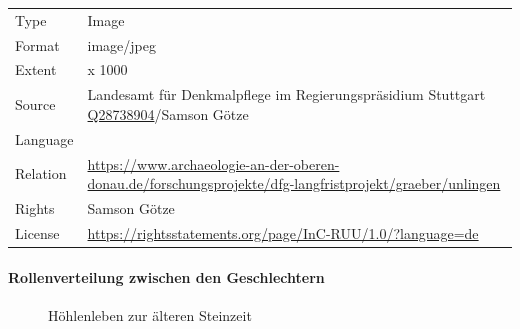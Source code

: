 \documentclass[
  letterpaper,
  DIV=11,
  numbers=noendperiod]{scrartcl}
\let\oldparagraph\paragraph
\renewcommand{\paragraph}[1]{\oldparagraph{#1}\mbox{}}
\begin{document}
\begin{longtable}[]{@{}
  >{\raggedright\arraybackslash}p{}
  >{\raggedright\arraybackslash}p{}@{}}
Type & Image \\
Format & image/jpeg \\
Extent & 703 x 1000 \\
Source & Landesamt für Denkmalpflege im Regierungspräsidium Stuttgart
\href{https://www.wikidata.org/wiki/Q28738904}{Q28738904}/Samson
Götze \\
Language & \\
Relation &
\url{https://www.archaeologie-an-der-oberen-donau.de/forschungsprojekte/dfg-langfristprojekt/graeber/unlingen} \\
Rights & Samson Götze \\
License &
\url{https://rightsstatements.org/page/InC-RUU/1.0/?language=de} \\
\end{longtable}

\paragraph{Rollenverteilung zwischen den
Geschlechtern}\label{rollenverteilung-zwischen-den-geschlechtern}

\begin{figure}


\caption{\label{fig-hoehlenleben-zur-aelteren-steinzeit}Höhlenleben zur
älteren Steinzeit}

\end{figure}%
\end{document}
